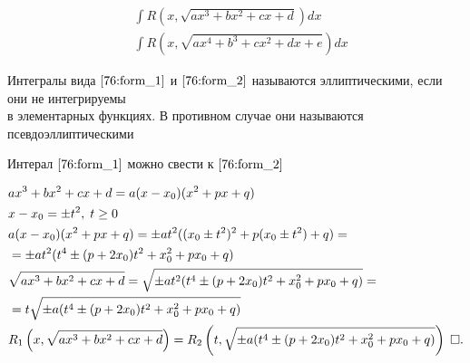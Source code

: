 \documentclass{article}
\begin{document}
\begin{align}
	&\int R\left(x,\sqrt{ax^{3}+bx^{2}+cx+d}\right)dx\label{76:form_1}\\
	&\int R\left(x,\sqrt{ax^{4}+b^{3}+cx^{2}+dx+e}\right)dx\label{76:form_2}
\end{align}

Интегралы вида $\eqref{76:form_1}$ и $\eqref{76:form_2}$ называются эллиптическими, если они не интегрируемы\\
в элементарных функциях. В противном случае они называются псевдоэллиптическими

\theorem

Интерал $\eqref{76:form_1}$ можно свести к $\eqref{76:form_2}$

\proof
\begin{align*}
	&ax^{3}+bx^{2}+cx+d=a(x-x_0)(x^{2}+px+q)\\
	&x-x_0=\pm t^{2},\;t\geq 0\\
	&a(x-x_0)(x^{2}+px+q)=\pm at^{2}((x_0\pm t^{2})^{2}+p(x_0\pm t^{2})+q)=\\
	&=\pm at^{2}(t^{4}\pm (p+2x_0)t^{2}+x_0^{2}+px_0+q)\\
	&\sqrt{ax^{3}+bx^{2}+cx+d}=\sqrt{\pm at^{2}(t^{4}\pm (p+2x_0)t^{2}+x_0^{2}+px_0+q)}=\\
	&=t\sqrt{\pm a(t^{4}\pm (p+2x_0)t^{2}+x_0^{2}+px_0+q)}\\
	&R_1\left(x,\sqrt{ax^{3}+bx^{2}+cx+d}\right)=R_2\left(t,\sqrt{\pm a(t^{4}\pm (p+2x_0)t^{2}+x_0^{2}+px_0+q)}\right)\qed
\end{align*}
\end{document}
